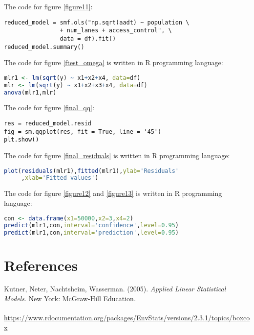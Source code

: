 \documentclass[english]{article}
\begin{document}
The code for figure \ref{figure11}:
\begin{lstlisting}[frame=trBL]
reduced_model = smf.ols("np.sqrt(aadt) ~ population \ 
                + num_lanes + access_control", \ 
                data = df).fit()
reduced_model.summary()
\end{lstlisting}

The code for figure \ref{ftest_omega} is written in R programming language:
\begin{lstlisting}[frame=trBL, language = R]
mlr1 <- lm(sqrt(y) ~ x1+x2+x4, data=df)
mlr <- lm(sqrt(y) ~ x1+x2+x3+x4, data=df)
anova(mlr1,mlr)
\end{lstlisting}

The code for figure \ref{final_qq}:
\begin{lstlisting}[frame=trBL]
res = reduced_model.resid
fig = sm.qqplot(res, fit = True, line = '45')
plt.show()
\end{lstlisting}

The code for figure \ref{final_residuals} is written in R programming language:
\begin{lstlisting}[frame=trBL, language = R]
plot(residuals(mlr1),fitted(mlr1),ylab='Residuals'
     ,xlab='Fitted values')
\end{lstlisting}

The code for figure \ref{figure12} and \ref{figure13} is written in R programming language:
\begin{lstlisting}[frame=trBL, language = R]
con <- data.frame(x1=50000,x2=3,x4=2)
predict(mlr1,con,interval='confidence',level=0.95)
predict(mlr1,con,interval='prediction',level=0.95)
\end{lstlisting}

\section{References}
Kutner, Neter, Nachtsheim, Wasserman. (2005). \textit{Applied Linear Statistical Models}. New York: McGraw-Hill Education.   \\ \\

\url{https://www.rdocumentation.org/packages/EnvStats/versions/2.3.1/topics/boxcox}
\end{document}
